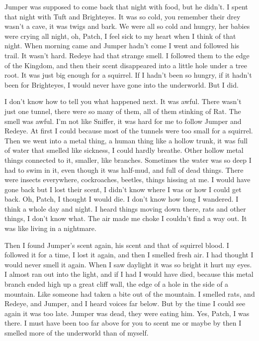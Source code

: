 \documentclass[12pt]{book}
\begin{document}
Jumper was supposed to come back that night with food, but he didn't. I spent that night with Tuft and Brighteyes. It was so cold, you remember their drey wasn't a cave, it was twigs and bark. We were all so cold and hungry, her babies were crying all night, oh, Patch, I feel sick to my heart when I think of that night. When morning came and Jumper hadn't come I went and followed his trail. It wasn't hard. Redeye had that strange smell. I followed them to the edge of the Kingdom, and then their scent disappeared into a little hole under a tree root. It was just big enough for a squirrel. If I hadn't been so hungry, if it hadn't been for Brighteyes, I would never have gone into the underworld. But I did.

I don't know how to tell you what happened next. It was awful. There wasn't just one tunnel, there were so many of them, all of them stinking of Rat. The smell was awful. I'm not like Sniffer, it was hard for me to follow Jumper and Redeye. At first I could because most of the tunnels were too small for a squirrel. Then we went into a metal thing, a human thing like a hollow trunk, it was full of water that smelled like sickness, I could hardly breathe. Other hollow metal things connected to it, smaller, like branches. Sometimes the water was so deep I had to swim in it, even though it was half-mud, and full of dead things. There were insects everywhere, cockroaches, beetles, things hissing at me. I would have gone back but I lost their scent, I didn't know where I was or how I could get back. Oh, Patch, I thought I would die. I don't know how long I wandered. I think a whole day and night. I heard things moving down there, rats and other things, I don't know what. The air made me choke I couldn't find a way out. It was like living in a nightmare.

Then I found Jumper's scent again, his scent and that of squirrel blood. I followed it for a time, I lost it again, and then I smelled fresh air. I had thought I would never smell it again. When I saw daylight it was so bright it hurt my eyes. I almost ran out into the light, and if I had I would have died, because this metal branch ended high up a great cliff wall, the edge of a hole in the side of a mountain. Like someone had taken a bite out of the mountain. I smelled rats, and Redeye, and Jumper, and I heard voices far below. But by the time I could see again it was too late. Jumper was dead, they were eating him. Yes, Patch, I was there. I must have been too far above for you to scent me %
or maybe by then I smelled more of the underworld than of myself.
\end{document}
